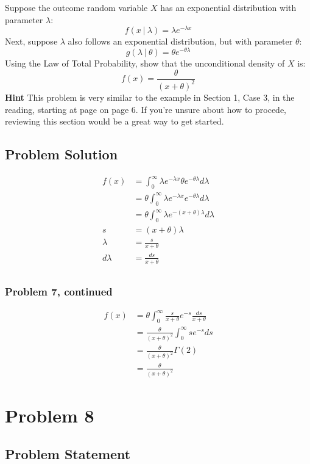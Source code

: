 \documentclass[12pt]{article}
\theoremstyle{definition}
\begin{document}
Suppose the outcome random variable $X$ has an exponential distribution with parameter $\lambda$:
$$
f(x\ |\ \lambda) = \lambda  e^{-\lambda x}
$$
Next, suppose $\lambda$ also follows an exponential distribution, but with parameter $\theta$:
$$
g(\lambda\ |\ \theta) = \theta e^{-\theta \lambda}
$$
Using the Law of Total Probability, show that the unconditional density of $X$ is:
$$
f(x) = \frac{ \theta }{(x + \theta)^2}
$$
{\bf Hint} This problem is very similar to the example in Section 1, Case 3, in the reading, starting at page on page 6. If you're unsure about how to procede, reviewing this section would be a great way to get started.

\subsection*{Problem Solution}
\begin{align*}
f(x) &= \int_0^\infty \lambda e^{-\lambda x} \theta e^{-\theta\lambda}d\lambda\\
&= \theta \int_0^\infty \lambda e^{-\lambda x} e^{-\theta\lambda}d\lambda\\
&= \theta \int_0^\infty \lambda e^{-(x + \theta)\lambda}d\lambda\\
s &= (x + \theta)\lambda\\
\lambda &= \frac{s}{x + \theta}\\
d\lambda &= \frac{ds}{x + \theta}\\
\end{align*}

\newpage
\subsubsection*{Problem 7, continued}
\begin{align*}
f(x) &= \theta \int_0^\infty \frac{s}{x + \theta} e^{-s} \frac{ds}{x + \theta}\\
&= \frac{\theta}{(x + \theta)^2} \int_0^\infty se^{-s}ds\\
&= \frac{\theta}{(x + \theta)^2} \Gamma(2)\\
&= \frac{\theta}{(x + \theta)^2}
\end{align*}


\newpage
\section*{Problem 8}

\subsection*{Problem Statement}
\end{document}
